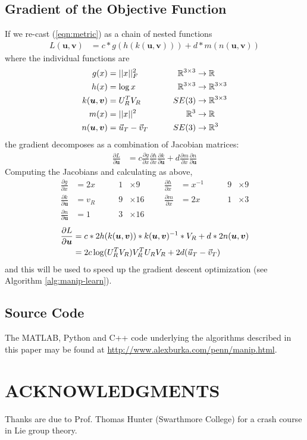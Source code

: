 \documentclass[letterpaper, 10 pt, conference]{ieeeconf}  %
\newcommand\deriv[2]{\ensuremath{\frac{\partial #1}{\partial #2}}}
\def\xmat{\uppercase}    \def\xmatstr{in uppercase}
\def\xvec{\vec}          \def\xvecstr{with an arrow}
\def\xse{\bm}            \def\xsestr{in boldface}
\begin{document}
\subsection{Gradient of the Objective Function} \label{sec:gradient}
If we re-cast (\ref{eqn:metric}) as a chain of nested functions
\begin{align}
  L(\xse{u},\xse{v}) &= c*g(h(k(\xse{u}, \xse{v}))) + d*m(n(\xse{u}, \xse{v}))
\end{align}
where the individual functions are
\begin{alignat*}{3}
  g(x) &= ||x||_F^2 \quad\quad& \mathbb{R}^{3 \times 3} &\rightarrow \mathbb{R} \\
  h(x) &= \log{x} \quad\quad& \mathbb{R}^{3 \times 3} &\rightarrow \mathbb{R}^{3 \times 3} \\
  k(\xse{u},\xse{v}) &= \xmat{u}_R^T \xmat{v}_R \quad\quad& SE(3) &\rightarrow \mathbb{R}^{3 \times 3} \\
  m(x) &= ||x||^2 \quad\quad& \mathbb{R}^3 &\rightarrow \mathbb{R} \\
  n(\xse{u},\xse{v}) &= \xvec{u}_T - \xvec{v}_T \quad\quad& SE(3) &\rightarrow \mathbb{R}^3
\end{alignat*}
the gradient decomposes as a combination of Jacobian matrices:
\begin{align}
  \deriv{L}{\xse{u}} &= c\deriv{g}{x}\deriv{h}{x}\deriv{k}{\xse{u}} + d\deriv{m}{x}\deriv{n}{\xse{u}}
\end{align}
Computing the Jacobians and calculating as above,
\begin{align*}
  \deriv{g}{x} &= 2x \quad\quad& 1 &\times 9 &&& %
  \deriv{h}{x} &= x^{-1} \quad\quad& 9 &\times 9 \\
  \deriv{k}{\xse{u}} &= v_R \quad\quad& 9 &\times 16 &&&
  \deriv{m}{x} &= 2x \quad\quad& 1 &\times 3 \\
  \deriv{n}{\xse{u}} &= 1 \quad\quad& 3 &\times 16
\end{align*}
\begin{align}
  \deriv{L}{\xse{u}} &= c*2h(k(\xse{u},\xse{v}))*k(\xse{u},\xse{v})^{-1}*\xmat{v}_R + d*2n(\xse{u},\xse{v}) \nonumber\\
                     &= 2c\log(\xmat{u}_R^T\xmat{v}_R)\xmat{v}_R^T\xmat{u}_R\xmat{v}_R + 2d(\xvec{u}_T-\xvec{v}_T)
\end{align}
and this will be used to speed up the gradient descent optimization (see Algorithm \ref{alg:manip-learn}).

\subsection{Source Code}
The MATLAB, Python and C++ code underlying the algorithms described in this paper may be found at {\hfil{} \hfilneg \hbox{\url{http://www.alexburka.com/penn/manip.html}}}.

\section*{ACKNOWLEDGMENTS}

Thanks are due to Prof. Thomas Hunter (Swarthmore College) for a crash course in Lie group theory.




\end{document}

